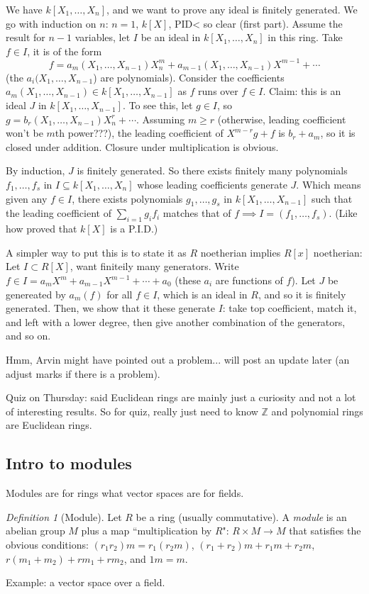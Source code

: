 \documentclass{article}
\theoremstyle{plain}
\theoremstyle{remark}
\newtheorem{definition}{Definition}
\newcommand{\Z}{{\mathbb Z}}
\begin{document}
We have $k[X_1,\dots,X_n]$, and we want to prove any ideal is finitely generated.
We go with induction on $n$: $n = 1$, $k[X]$, PID< so clear (first part).
Assume the result for $n-1$ variables,
let $I$ be an ideal in $k[X_1,\dots,X_n]$ in this ring.
Take $f \in I$, it is of the form
\[
	f = a_m(X_1,\dots,X_{n-1})X_n^m + a_{m-1}(X_1,\dots,X_{n-1})X^{m-1}
	+ \cdots
\]
(the $a_i(X_1,\dots,X_{n-1}$) are polynomials).
Consider the coefficients $a_m(X_1,\dots,X_{n-1}) \in k[X_1,\dots,X_{n-1}]$
as $f$ runs over $f \in I$.
Claim: this is an ideal $J$ in $k[X_1,\dots,X_{n-1}]$.
To see this, let $g \in I$,
so $g = b_r(X_1,\dots,X_{n-1})X_n^r + \cdots$.
Assuming $m \geq r$ (otherwise, leading coefficient won't be $m$th power???),
the leading coefficient of $X^{m-r}g + f$ is $b_r + a_m$,
so it is closed under addition.
Closure under multiplication is obvious.

By induction, $J$ is finitely generated.
So there exists finitely many polynomials
$f_1,\dots,f_s$ in $I \subseteq k[X_1,\dots,X_n]$ whose leading coefficients generate $J$.
Which means given any $f \in I$, there exists polynomials $g_1,\dots,g_s$
in $k[X_1,\dots,X_{n-1}]$ such that
the leading coefficient of $\sum_{i=1} g_i f_i$ matches that of
$f \implies I = (f_1,\dots,f_s)$.
(Like how proved that $k[X]$ is a P.I.D.)

A simpler way to put this is to state it as
$R$ noetherian implies $R[x]$ noetherian:
Let $I \subset R[X]$, want finiteily many generators.
Write $f \in I = a_mX^m + a_{m-1}X^{m-1} + \cdots + a_0$
(these $a_i$ are functions of $f$).
Let $J$ be genereated by $a_m(f)$ for all $f \in I$,
which is an ideal in $R$, and so it is finitely generated.
Then, we show that it these generate $I$:
take top coefficient, match it, and left with a lower degree,
then give another combination of the generators, and so on.

Hmm, Arvin might have pointed out a problem...
will post an update later
(an adjust marks if there is a problem).

Quiz on Thursday: said Euclidean rings are mainly just a curiosity
and not a lot of interesting results.
So for quiz, really just need to know $\Z$ and polynomial rings
are Euclidean rings.

\subsection{Intro to modules}
Modules are for rings what vector spaces are for fields.
\begin{definition}[Module]
	Let $R$ be a ring (usually commutative).
	A \emph{module} is an abelian group $M$ plus a map
	``multiplication by $R$": $R\times M \to M$
	that satisfies the obvious conditions:
	$(r_1r_2)m = r_1(r_2m)$, $(r_1+r_2)m + r_1m+r_2m$,
	$r(m_1+m_2) + rm_1 + rm_2$, and $1m = m$.
\end{definition}
Example: a vector space over a field.
\end{document}
